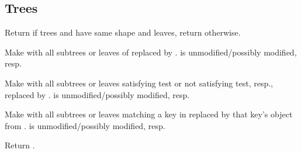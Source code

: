\subsection{Trees} 
\begin{LIST}{1cm}

  Return \retval{\T} if trees  and  have same
  shape and  leaves, return \retval{\NIL} otherwise.

  Make  with all subtrees or leaves of  replaced by
  .  is unmodified/possibly modified, resp.

  Make  with all subtrees or leaves
  satisfying test or not satisfying test, resp., replaced by
  .  is unmodified/possibly modified, resp.

  Make  with all subtrees or leaves matching
  a key in  replaced by that key's object from . 
   is unmodified/possibly modified, resp.
  
  Return .

\end{LIST}


